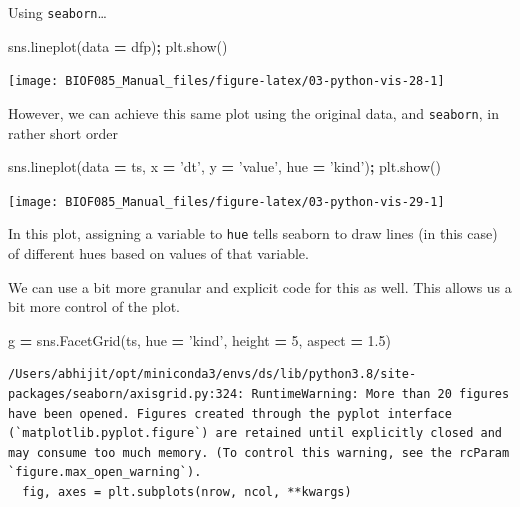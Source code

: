 \documentclass[
  letterpaper,
]{scrbook}
\newenvironment{Shaded}{\begin{snugshade}}{\end{snugshade}}
\newcommand{\DecValTok}[1]{\textcolor[rgb]{0.00,0.00,0.81}{#1}}
\newcommand{\FloatTok}[1]{\textcolor[rgb]{0.00,0.00,0.81}{#1}}
\newcommand{\NormalTok}[1]{#1}
\newcommand{\OperatorTok}[1]{\textcolor[rgb]{0.81,0.36,0.00}{\textbf{#1}}}
\newcommand{\StringTok}[1]{\textcolor[rgb]{0.31,0.60,0.02}{#1}}
\begin{document}
Using \texttt{seaborn}\ldots{}

\begin{Shaded}
\begin{Highlighting}[]
\NormalTok{sns.lineplot(data }\OperatorTok{=}\NormalTok{ dfp)}\OperatorTok{;}
\NormalTok{plt.show()}
\end{Highlighting}
\end{Shaded}

\begin{center}\texttt{[image: BIOF085\_Manual\_files/figure-latex/03-python-vis-28-1]} \end{center}

However, we can achieve this same plot using the original data, and \texttt{seaborn}, in rather short order

\begin{Shaded}
\begin{Highlighting}[]
\NormalTok{sns.lineplot(data }\OperatorTok{=}\NormalTok{ ts, x }\OperatorTok{=} \StringTok{'dt'}\NormalTok{, y }\OperatorTok{=} \StringTok{'value'}\NormalTok{, hue }\OperatorTok{=} \StringTok{'kind'}\NormalTok{)}\OperatorTok{;}
\NormalTok{plt.show()}
\end{Highlighting}
\end{Shaded}

\begin{center}\texttt{[image: BIOF085\_Manual\_files/figure-latex/03-python-vis-29-1]} \end{center}

In this plot, assigning a variable to \texttt{hue} tells seaborn to draw lines (in this case) of different hues based on values of that variable.

We can use a bit more granular and explicit code for this as well. This allows us a bit more control of the plot.

\begin{Shaded}
\begin{Highlighting}[]
\NormalTok{g }\OperatorTok{=}\NormalTok{ sns.FacetGrid(ts, hue }\OperatorTok{=} \StringTok{'kind'}\NormalTok{, height }\OperatorTok{=} \DecValTok{5}\NormalTok{, aspect }\OperatorTok{=} \FloatTok{1.5}\NormalTok{)}
\end{Highlighting}
\end{Shaded}

\begin{verbatim}
/Users/abhijit/opt/miniconda3/envs/ds/lib/python3.8/site-packages/seaborn/axisgrid.py:324: RuntimeWarning: More than 20 figures have been opened. Figures created through the pyplot interface (`matplotlib.pyplot.figure`) are retained until explicitly closed and may consume too much memory. (To control this warning, see the rcParam `figure.max_open_warning`).
  fig, axes = plt.subplots(nrow, ncol, **kwargs)
\end{verbatim}
\end{document}
